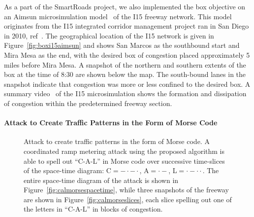 As a part of the SmartRoads project, we also implemented the box objective on an Aimsun microsimulation model~\cite{barcelo2001microscopic} of the I15 freeway network. This model originates from the I15 integrated corridor management project ran in San Diego in 2010, ref~\cite{miller2010san}. The geographical location of the I15 network is given in Figure~\ref{fig:boxi15aimsun} and shows San Marcos as the southbound start and Mira Mesa as the end, with the desired box of congestion placed approximately 5 miles before Mira Mesa. A snapshot of the northern and southern extents of the box at the time of 8:30 are shown below the map. The south-bound lanes in the snapshot indicate that congestion was more or less confined to the desired box. A summary video~\cite{smartroadswebsite} of the I15 microsimulation shows the formation and dissipation of congestion within the predetermined freeway section.

\paragraph{Attack to Create Traffic Patterns in the Form of Morse Code}

\begin{figure}[h]%
\centering%
\hfill%
\caption{Attack to create traffic patterns in the form of Morse code. A coordinated ramp metering attack using the proposed algorithm is able to spell out ``C-A-L'' in Morse code over successive time-slices of the space-time diagram: C$=- \cdot - \cdot$, A$= \cdot -$, L$= \cdot - \cdot \cdot$. The entire space-time diagram of the attack is shown in Figure~\ref{fig:calmorsespacetime}, while three snapshots of the freeway are shown in Figure~\ref{fig:calmorseslices}, each slice spelling out one of the letters in ``C-A-L'' in blocks of congestion.}
\label{fig:cal_morse}
\end{figure}


